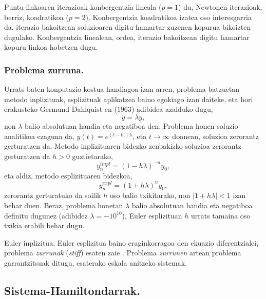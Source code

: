Puntu-finkoaren iterazioak konbergentzia lineala ($p=1$) du, Newtonen iterazioak, berriz, koadratikoa ($p=2$). Konbergentzia koadratikoa izatea oso interesgarria da, iterazio bakoitzean soluzioaren digitu hamartar zuzenen kopurua bikoizten dugulako. Konbergentzia linealean, ordea, iterazio bakoitzean digitu hamartar kopuru finkoa hobetzen dugu. 
  
\subsubsection*{Problema zurruna.}

Urrats baten konputazio-kostua handiagoa izan arren, problema batzuetan metodo inplizituak, esplizituak aplikatzea baino egokiago izan daiteke, eta hori erakusteko Germund Dahlquist-en ($1963$) adibidea azalduko dugu,
\begin{equation}
 \label{eq:202c}
\dot y=\lambda y,
\end{equation} 
non $\lambda$ balio absolutuan handia eta negatiboa den. Problema honen soluzio analitikoa ezaguna da, $y(t)=e^{(t-t_0)\lambda}$, eta $t \rightarrow \infty$ doanean, soluzioa zerorantz gerturatzen da. Metodo inplizituaren bidezko zenbakizko soluzioa zerorantz gerturatzen da $h>0$ guztietarako,
\begin{equation*}
y_n^{impl}=(1-h\lambda)^{-n} y_0,
\end{equation*}    
eta aldiz, metodo esplizituaren bidezkoa,
\begin{equation*}
y_n^{expl}=(1+h\lambda)^{n} y_0,
\end{equation*}    
zerorantz gerturatuko da soilik $h$ oso balio txikitarako, non $|1+h\lambda|<1$ izan behar duen. Beraz, problema honetan $\lambda$ balio absolutuan handia  eta negatiboa definitu dugunez (adibidez $\lambda=-10^{10}$), Euler esplizituan $h$ urrats tamaina oso txikia erabili behar dugu.    

Euler inplizitua, Euler esplizitua baino eraginkorragoa den ekuazio diferentzialei, problema \emph{zurrunak} (\emph{stiff}) esaten zaie \cite{Hairer2006}. Problema \emph{zurrunen} artean problema garrantzitsuak ditugu, esaterako eskala anitzeko sistemak. 

 

\subsection{Sistema-Hamiltondarrak.}

